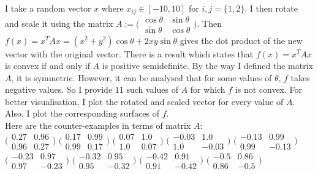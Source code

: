 \documentclass{article}
\begin{document}
\begin{flushleft}
I take a random vector $x$ where $x_{ij}\in[-10,10]$ for $i,j=\{1,2\}$. I then rotate and scale it using the matrix $A:=\Big(\begin{matrix}\cos\theta & \sin\theta \\ \sin\theta & \cos\theta\end{matrix}\Big)$. Then $f(x)=x^{T}Ax=(x^{2}+y^{2})\cos\theta+2xy\sin\theta$ gives the dot product of the new vector with the original vector. There is a result which states that $f(x)=x^{T}Ax$ is convex if and only if $A$ is positive semidefinite. By the way I defined the matrix $A$, it is symmetric. However, it can be analysed that for some values of $\theta$, $f$ takes negative values. So I provide $11$ such values of $A$ for which $f$ is not convex. For better visualisation, I plot the rotated and scaled vector for every value of $A$. Also, I plot the corresponding surfaces of $f$.\\
Here are the counter-examples in terms of matrix $A$:\\
$\Big(\begin{matrix}0.27 & 0.96 \\ 0.96 & 0.27\end{matrix}\Big)$
$\Big(\begin{matrix}0.17 & 0.99 \\ 0.99 & 0.17\end{matrix}\Big)$
$\Big(\begin{matrix}0.07 & 1.0 \\ 1.0 & 0.07\end{matrix}\Big)$
$\Big(\begin{matrix}-0.03 & 1.0 \\ 1.0 & -0.03\end{matrix}\Big)$
$\Big(\begin{matrix}-0.13 & 0.99 \\ 0.99 & -0.13\end{matrix}\Big)$
$\Big(\begin{matrix}-0.23 & 0.97 \\ 0.97 & -0.23\end{matrix}\Big)$
$\Big(\begin{matrix}-0.32 & 0.95 \\ 0.95 & -0.32\end{matrix}\Big)$
$\Big(\begin{matrix}-0.42 & 0.91 \\ 0.91 & -0.42\end{matrix}\Big)$
$\Big(\begin{matrix}-0.5 & 0.86 \\ 0.86 & -0.5\end{matrix}\Big)$

\end{flushleft}
\end{document}
